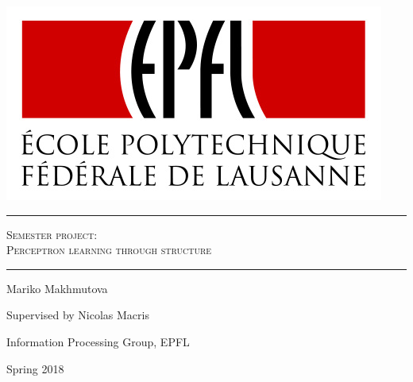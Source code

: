 \newcommand{\HRule}[1]{\rule{\linewidth}{#1}}

\begin{titlepage}
	\centering
	\includegraphics{images/epfl-logo.jpg}\par
	\vspace{1cm}
	\HRule{0.5pt}
	{\scshape \Large Semester project: \\ Perceptron learning through structure}
	\vspace{1cm}
    \HRule{0.5pt}
	{\Large Mariko Makhmutova\par}
	\vspace{8cm}
	{\large Supervised by Nicolas Macris\par}
	{\large Information Processing Group, EPFL \par}
	{\large Spring 2018\par}
	\vfill
\end{titlepage}